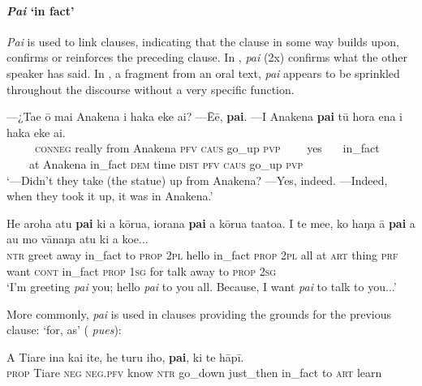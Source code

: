 \paragraph{\textit{Pa{\ꞌ}i} ‘in fact’}\label{sec:4.5.4.2.1} \textit{Pa{\ꞌ}i} is used to link clauses, indicating that the clause in some way builds upon, confirms or reinforces the preceding clause. In , \textit{\mbox{pa{\ꞌ}i}} (2x) confirms what the other speaker has said. In , a fragment from an oral text, \textit{pa{\ꞌ}i} appears to be sprinkled throughout the discourse without a very specific function. 

\ea\label{ex:4.161}
\gll —¿Ta{\ꞌ}e {\ꞌ}ō mai {\ꞌ}Anakena i haka eke ai? —{\ꞌ}Ēē, \textbf{pa{\ꞌ}i}. —{\ꞌ}I {\ꞌ}Anakena \textbf{pa{\ꞌ}i} tū hora ena i haka eke ai. \\
~~~~~\textsc{conneg} really from Anakena \textsc{pfv} \textsc{caus} go\_up \textsc{pvp} ~~~~yes~~~ in\_fact ~~~~at Anakena in\_fact \textsc{dem} time \textsc{dist} \textsc{pfv} \textsc{caus} go\_up \textsc{pvp} \\

\glt 
‘—Didn’t they take (the statue) up from Anakena? —Yes, indeed. —Indeed, when they took it up, it was in Anakena.’ \textstyleExampleref{[R412.159–160]}
\z

\ea\label{ex:4.162}
\gll He {\ꞌ}aroha atu \textbf{pa{\ꞌ}i} ki a kōrua, {\ꞌ}iorana \textbf{pa{\ꞌ}i} a kōrua ta{\ꞌ}ato{\ꞌ}a.  {\ꞌ}I te me{\ꞌ}e, ko haŋa {\ꞌ}ā \textbf{pa{\ꞌ}i} a au mo vānaŋa atu ki a koe... \\
\textsc{ntr} greet away in\_fact to \textsc{prop} \textsc{2pl} hello in\_fact \textsc{prop} \textsc{2pl} all  at \textsc{art} thing \textsc{prf} want \textsc{cont} in\_fact \textsc{prop} \textsc{1sg} for talk away to \textsc{prop} \textsc{2sg} \\

\glt
‘I’m greeting \textit{pa{\ꞌ}i} you; hello \textit{pa{\ꞌ}i} to you all. Because, I want \textit{pa{\ꞌ}i} to talk to you...’ \textstyleExampleref{[R403.001–003]}
\z

More commonly, \textit{pa{\ꞌ}i} is used in clauses providing the grounds for the previous clause: ‘for, as’ ( \textit{pues}):

\ea\label{ex:4.163}
\gll A Tiare {\ꞌ}ina kai {\ꞌ}ite, he turu iho, \textbf{pa{\ꞌ}i}, ki te hāpī. \\
\textsc{prop} Tiare \textsc{neg} \textsc{neg.pfv} know \textsc{ntr} go\_down just\_then in\_fact to \textsc{art} learn \\

